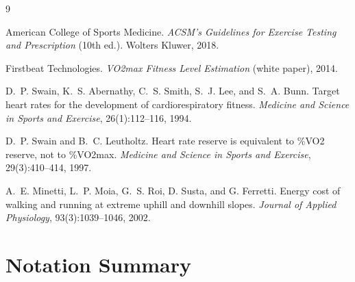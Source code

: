\documentclass[11pt,a4paper]{article}
\begin{document}
\begin{thebibliography}{9}

American College of Sports Medicine.
\textit{ACSM's Guidelines for Exercise Testing and Prescription} (10th ed.).
Wolters Kluwer, 2018.

Firstbeat Technologies.
\textit{VO2max Fitness Level Estimation} (white paper), 2014.

D.~P. Swain, K.~S. Abernathy, C.~S. Smith, S.~J. Lee, and S.~A. Bunn.
Target heart rates for the development of cardiorespiratory fitness.
\textit{Medicine and Science in Sports and Exercise}, 26(1):112--116, 1994.

D.~P. Swain and B.~C. Leutholtz.
Heart rate reserve is equivalent to \%VO2 reserve, not to \%VO2max.
\textit{Medicine and Science in Sports and Exercise}, 29(3):410--414, 1997.

A.~E. Minetti, L.~P. Moia, G.~S. Roi, D. Susta, and G. Ferretti.
Energy cost of walking and running at extreme uphill and downhill slopes.
\textit{Journal of Applied Physiology}, 93(3):1039--1046, 2002.

\end{thebibliography}


\appendix

\section{Notation Summary}
\label{app:notation}
\end{document}

